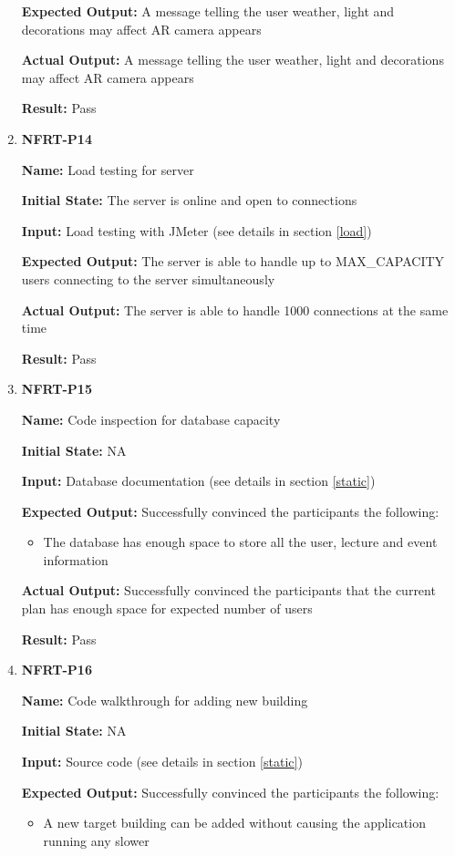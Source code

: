 \documentclass[12pt, titlepage]{article}
\begin{document}
\begin{enumerate}
\textbf{Expected Output:} A message telling the user weather, light and decorations may affect AR camera appears

\textbf{Actual Output:} A message telling the user weather, light and decorations may affect AR camera appears

\textbf{Result:} Pass

\item \textbf{NFRT-P14}

\textbf{Name:} Load testing for server

\textbf{Initial State:} The server is online and open to connections

\textbf{Input:} Load testing with JMeter (see details in section \ref{load})

\textbf{Expected Output:} The server is able to handle up to MAX\_CAPACITY users connecting to the server simultaneously

\textbf{Actual Output:} The server is able to handle 1000 connections at the same time

\textbf{Result:} Pass

\item \textbf{NFRT-P15}

\textbf{Name:} Code inspection for database capacity

\textbf{Initial State:} NA

\textbf{Input:} Database documentation (see details in section \ref{static})

\textbf{Expected Output:} Successfully convinced the participants the following:
\begin{itemize}
\item The database has enough space to store all the user, lecture and event information
\end{itemize}

\textbf{Actual Output:} Successfully convinced the participants that the current plan has enough space for expected number of users

\textbf{Result:} Pass

\item \textbf{NFRT-P16}

\textbf{Name:} Code walkthrough for adding new building

\textbf{Initial State:} NA

\textbf{Input:} Source code (see details in section \ref{static})

\textbf{Expected Output:} Successfully convinced the participants the following:
\begin{itemize}
\item A new target building can be added without causing the application running any slower
\end{itemize}


\end{enumerate}
\end{document}

